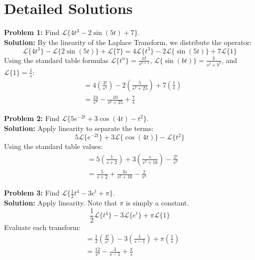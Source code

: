 \documentclass[11pt, letterpaper]{article}
\theoremstyle{definition}
\theoremstyle{remark}
\begin{document}
\newpage

\section{Detailed Solutions}

\textbf{Problem 1:} Find $\mathscr{L}\{4t^3 - 2\sin(5t) + 7\}$.
\vspace{0.5em} \\
\textbf{Solution:} By the linearity of the Laplace Transform, we distribute the operator:
\[
\mathscr{L}\{4t^3\} - \mathscr{L}\{2\sin(5t)\} + \mathscr{L}\{7\} = 4\mathscr{L}\{t^3\} - 2\mathscr{L}\{\sin(5t)\} + 7\mathscr{L}\{1\}
\]
Using the standard table formulas $\mathscr{L}\{t^n\} = \frac{n!}{s^{n+1}}$, $\mathscr{L}\{\sin(bt)\} = \frac{b}{s^2+b^2}$, and $\mathscr{L}\{1\} = \frac{1}{s}$:
\begin{align*}
    &= 4\left(\frac{3!}{s^4}\right) - 2\left(\frac{5}{s^2 + 25}\right) + 7\left(\frac{1}{s}\right) \\[4pt]
    &= \frac{24}{s^4} - \frac{10}{s^2 + 25} + \frac{7}{s}
\end{align*}

\vspace{1em}
\textbf{Problem 2:} Find $\mathscr{L}\{5e^{-2t} + 3\cos(4t) - t^2\}$.
\vspace{0.5em} \\
\textbf{Solution:} Apply linearity to separate the terms:
\[
5\mathscr{L}\{e^{-2t}\} + 3\mathscr{L}\{\cos(4t)\} - \mathscr{L}\{t^2\}
\]
Using the standard table values:
\begin{align*}
    &= 5\left(\frac{1}{s + 2}\right) + 3\left(\frac{s}{s^2 + 16}\right) - \frac{2!}{s^3} \\[4pt]
    &= \frac{5}{s + 2} + \frac{3s}{s^2 + 16} - \frac{2}{s^3}
\end{align*}

\vspace{1em}
\textbf{Problem 3:} Find $\mathscr{L}\{\frac{1}{2}t^4 - 3e^{t} + \pi\}$.
\vspace{0.5em} \\
\textbf{Solution:} Apply linearity. Note that $\pi$ is simply a constant.
\[
\frac{1}{2}\mathscr{L}\{t^4\} - 3\mathscr{L}\{e^{t}\} + \pi\mathscr{L}\{1\}
\]
Evaluate each transform:
\begin{align*}
    &= \frac{1}{2}\left(\frac{4!}{s^5}\right) - 3\left(\frac{1}{s - 1}\right) + \pi\left(\frac{1}{s}\right) \\[4pt]
    &= \frac{12}{s^5} - \frac{3}{s - 1} + \frac{\pi}{s}
\end{align*}
\end{document}
